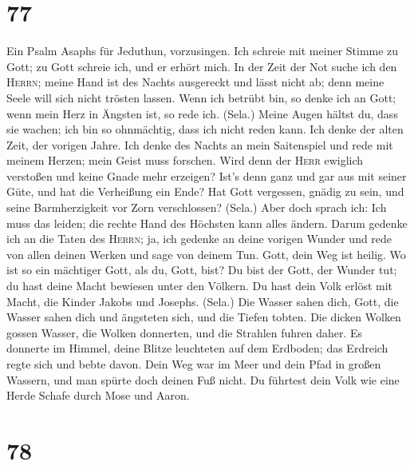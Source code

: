 \hypertarget{section-76}{%
\section{77}\label{section-76}}

 Ein Psalm Asaphs für Jeduthun, vorzusingen.
 Ich schreie mit meiner Stimme zu Gott; zu Gott schreie
ich, und er erhört mich.  In der Zeit der Not suche ich
den \textsc{Herrn}; meine Hand ist des Nachts ausgereckt und lässt nicht
ab; denn meine Seele will sich nicht trösten lassen.  Wenn
ich betrübt bin, so denke ich an Gott; wenn mein Herz in Ängsten ist, so
rede ich. (Sela.)  Meine Augen hältst du, dass sie wachen;
ich bin so ohnmächtig, dass ich nicht reden kann.  Ich
denke der alten Zeit, der vorigen Jahre.  Ich denke des
Nachts an mein Saitenspiel und rede mit meinem Herzen; mein Geist muss
forschen.  Wird denn der \textsc{Herr} ewiglich verstoßen
und keine Gnade mehr erzeigen?  Ist's denn ganz und gar
aus mit seiner Güte, und hat die Verheißung ein Ende? 
Hat Gott vergessen, gnädig zu sein, und seine Barmherzigkeit vor Zorn
verschlossen? (Sela.)  Aber doch sprach ich: Ich muss das
leiden; die rechte Hand des Höchsten kann alles ändern. 
Darum gedenke ich an die Taten des \textsc{Herrn}; ja, ich gedenke an
deine vorigen Wunder  und rede von allen deinen Werken
und sage von deinem Tun.  Gott, dein Weg ist heilig. Wo
ist so ein mächtiger Gott, als du, Gott, bist?  Du bist
der Gott, der Wunder tut; du hast deine Macht bewiesen unter den
Völkern.  Du hast dein Volk erlöst mit Macht, die Kinder
Jakobs und Josephs. (Sela.)  Die Wasser sahen dich, Gott,
die Wasser sahen dich und ängsteten sich, und die Tiefen tobten.
 Die dicken Wolken gossen Wasser, die Wolken donnerten,
und die Strahlen fuhren daher.  Es donnerte im Himmel,
deine Blitze leuchteten auf dem Erdboden; das Erdreich regte sich und
bebte davon.  Dein Weg war im Meer und dein Pfad in
großen Wassern, und man spürte doch deinen Fuß nicht.  Du
führtest dein Volk wie eine Herde Schafe durch Mose und Aaron.

\hypertarget{section-77}{%
\section{78}\label{section-77}}

